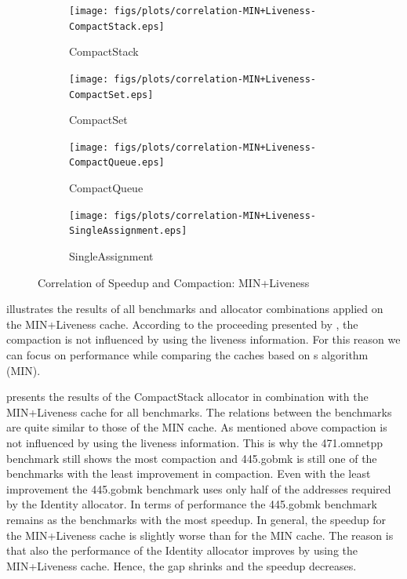 \documentclass[onecolumn, openright, master, english, signatures]{dbrgrptt}
\begin{document}
\begin{figure}[!ht]
  \begin{subfigure}[b]{0.5\textwidth}%
    \texttt{[image: figs/plots/correlation-MIN+Liveness-CompactStack.eps]}
    \caption{CompactStack}
    \label{fig:correlation-min-liveness-compactstack}
  \end{subfigure}%
  \begin{subfigure}[b]{0.5\textwidth}%
    \texttt{[image: figs/plots/correlation-MIN+Liveness-CompactSet.eps]}
    \caption{CompactSet}
    \label{fig:correlation-min-liveness-compactset}
  \end{subfigure}%
  \qquad
  \begin{subfigure}[b]{0.5\textwidth}%
    \texttt{[image: figs/plots/correlation-MIN+Liveness-CompactQueue.eps]}
    \caption{CompactQueue}
    \label{fig:correlation-min-liveness-compactqueue}
  \end{subfigure}%
  \begin{subfigure}[b]{0.5\textwidth}%
    \texttt{[image: figs/plots/correlation-MIN+Liveness-SingleAssignment.eps]}
    \caption{SingleAssignment}
    \label{fig:correlation-min-liveness-singleassignment}
  \end{subfigure}%
  \caption{Correlation of Speedup and Compaction: \ac{MIN}+Liveness}
  \label{fig:correlation-min-liveness}
\end{figure}

 illustrates the results of all benchmarks and allocator combinations applied on the \ac{MIN}+Liveness cache.
According to the proceeding presented by , the compaction is not influenced by using the liveness information.
For this reason we can focus on performance while comparing the caches based on \citeauthor{belady1966study}s algorithm (\ac{MIN}).

 presents the results of the CompactStack allocator in combination with the \ac{MIN}+Liveness cache for all benchmarks.
The relations between the benchmarks are quite similar to those of the \ac{MIN} cache.
As mentioned above compaction is not influenced by using the liveness information.
This is why the 471.omnetpp benchmark still shows the most compaction and 445.gobmk is still one of the benchmarks with the least improvement in compaction.
Even with the least improvement the 445.gobmk benchmark uses only half of the addresses required by the Identity allocator.
In terms of performance the 445.gobmk benchmark remains as the benchmarks with the most speedup.
In general, the speedup for the \ac{MIN}+Liveness cache is slightly worse than for the \ac{MIN} cache.
The reason is that also the performance of the Identity allocator improves by using the \ac{MIN}+Liveness cache.
Hence, the gap shrinks and the speedup decreases.
\end{document}
